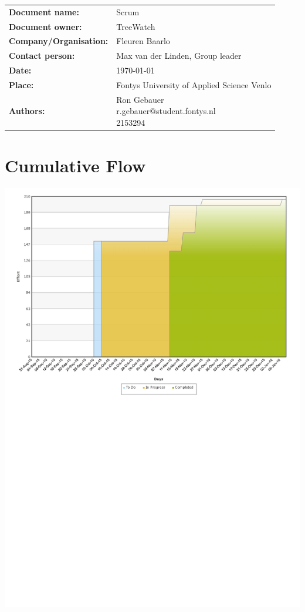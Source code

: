 \documentclass[12pt]{article}
\begin{document}
		\begin{tabular}{ll}
			\textbf{Document name:} & Scrum\\
			\textbf{Document owner:} & TreeWatch \\
			\textbf{Company/Organisation:} & Fleuren Baarlo \\
			\textbf{Contact person:} & Max van der Linden, Group leader \\
			\textbf{Date:} & \today \\
			\textbf{Place:} & Fontys University of Applied Science Venlo \\
			\textbf{Authors:} & \parbox[t]{5cm}{
			Ron Gebauer\\ r.gebauer@student.fontys.nl\\ 2153294 \\ }
		\end{tabular}
		\clearpage

	\tableofcontents
	\clearpage

	

	
	
	\section{Cumulative Flow}
		\includegraphics[width=1.25\textwidth,angle=90]{cumulativeflow}
		\clearpage
	
\end{document}

